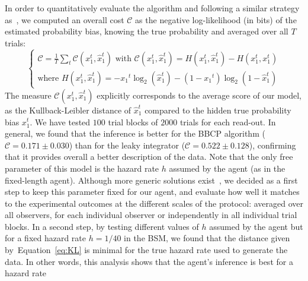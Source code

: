 \documentclass[10pt,letterpaper]{article}
\newcommand{\choice}[1]{ %
	\left\{ %
		\begin{array}{l} #1 \end{array} %
	\right. }
\newcommand{\eql}[1]{\begin{equation}#1\end{equation}}
\newcommand{\Cc}{\mathcal{C}}
\newcommand{\citep}[1]{\cite{#1}}
\newcommand{\citet}[1]{\cite{#1}}
\newcommand{\seeEq}[1]{Equation~\ref{eq:#1}}
\begin{document}
In order to quantitatively evaluate the algorithm and following a similar strategy as~\citet{Norton18},
we computed an overall cost $\Cc$ as the negative log-likelihood (in bits) of the estimated probability bias, knowing the true probability
and averaged over all $T$ trials:
\eql{
\choice{
 \Cc = \frac 1 T  \sum_t \Cc(x_1^t, \hat{x}_1^t)
 \text{ with }
 \Cc(x_1^t, \hat{x}_1^t) = H(x_1^t, \hat{x}_1^t ) - H(x_1^t, x_1^t ) \\
 \text{where } H(x_1^t, \hat{x}_1^t ) = - {x_1}^t \log_2( \hat{x}_1^t ) - (1-{x_1}^t) \log_2( 1- \hat{x}_1^t)
}
\label{eq:KL}
}
The measure $\Cc(x_1^t, \hat{x}_1^t)$ explicitly corresponds to the average score of our model,
as the Kullback-Leibler distance of $\hat{x}_1^t$ %
compared to the hidden true probability bias $x_1^t$.
We have tested $100$ trial blocks of $2000$ trials for each read-out.
In general, we found that the inference is better for the BBCP algorithm ($\Cc = 0.171 \pm 0.030$)
than for the leaky integrator ($\Cc = 0.522 \pm 0.128$), %
confirming that it provides overall a better description of the data.
Note that the only free parameter of this model is the hazard rate $h$
assumed by the agent (as in the fixed-length agent).
Although more generic solutions exist~\citep{Nassar10,Wilson13,Glaze15}, %
we decided as a first step to keep this parameter fixed for our agent,
and  evaluate how well it matches to the experimental outcomes at the different scales of the protocol:
averaged over all observers, for each individual observer or independently in all individual trial blocks.
In a second step, by testing different values of $h$ assumed by the agent
but for a fixed hazard rate $h=1/40$ in the BSM,
we found that the distance given by~\seeEq{KL} is minimal
for the true hazard rate used to generate the data.
In other words, this analysis shows that the agent's inference is best for a hazard rate
\end{document}
